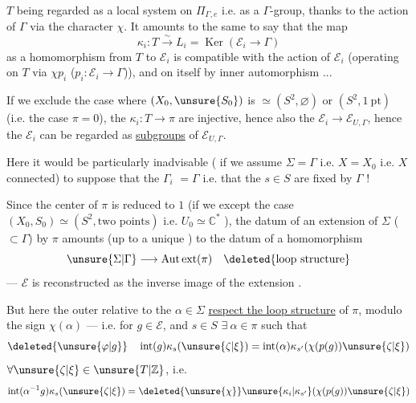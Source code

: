 
$T$ being regarded as a local system
on $\Pi_{\Gamma,e}$  i.e. as a $\Gamma$-group, thanks to the action
of $\Gamma$ via the character $\chi$. It amounts to the
same to say that  the map
\[
\kappa_i:T\xrightarrow{\sim}L_i=\operatorname{Ker}(\mathcal E_i\longrightarrow\Gamma)
\]
as a homomorphism from $T$ to $\mathcal E_i$ is
compatible with the action of $\mathcal E_i$ (operating
on $T$ via $\chi p_i$ ($p_i:\mathcal E_i\longrightarrow\Gamma$)),  and on
itself by inner automorphism ...

If we exclude the case where $(X_0,\unsure{S_0})$
is $\simeq(S^2,\varnothing)$ or $(S^2,1\ \mathrm{pt})$ (i.e.
the case $\pi=0$), the $\kappa_i:T\longrightarrow\pi$ are injective,
hence also the $\mathcal E_i\longrightarrow\mathcal E_{U,\Gamma}$, hence the
$\mathcal E_i$ can be regarded as
\uline{subgroups} of $\mathcal E_{U,\Gamma}$.

\unsure{\S} Here it  would be particularly
inadvisable ( if we assume $\Sigma=\Gamma$ i.e.
$X=X_0$ i.e. $X$ connected) to suppose that
the $\Gamma_i$  $=\Gamma$ i.e. that the $s\in S$ are fixed
by $\Gamma$ !


Since the center of $\pi$ is reduced to $1$
(if we except  the case $(X_0,S_0)\simeq(S^2,\text{two points})$
i.e. $U_0\simeq\mathbb C^*$ ), the datum of an extension
of $\Sigma$ ($\subset\Gamma$) by $\pi$ amounts (up to a unique )
to the datum of a homomorphism
\[
\unsure{\Sigma|\Gamma}\longrightarrow\mathrm{Aut\,ext}(\pi)\quad\deleted{\text{loop structure}}
\]
 --- $\mathcal E$ is reconstructed
as the inverse image of the extension
.

But here the outer  relative
to the $\alpha\in\Sigma$  \uline{respect the loop structure}
 of $\pi$, modulo the
sign $\chi(\alpha)$ --- i.e. for $g\in\mathcal E$, and $s\in S$
$\exists\ \alpha\in\pi$  such that
\[
\deleted{\unsure{\varphi|g}}\quad
\operatorname{int}(g)\kappa_s(\unsure{\zeta|\xi})
=\operatorname{int}(\alpha)\kappa_{s'}(\chi(p(g))\unsure{\zeta|\xi})
\]
$\forall\unsure{\zeta|\xi}\in\unsure{T|\mathbb Z}$, i.e.
\[
\operatorname{int}(\alpha^{-1}g)\kappa_s(\unsure{\zeta|\xi})
=\deleted{\unsure{\chi}}\unsure{\kappa_i|\kappa_{s'}}(\chi(p(g))\unsure{\zeta|\xi})
\]

